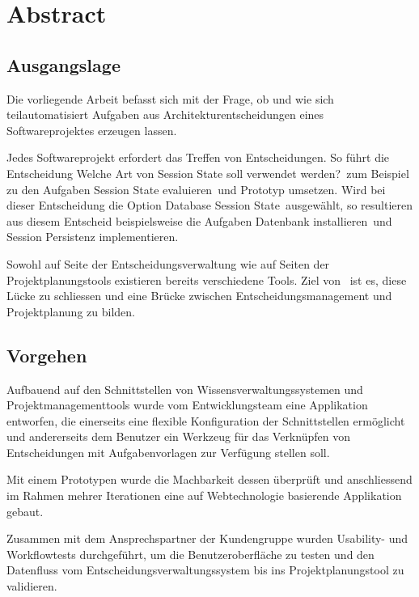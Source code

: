 \chapter{Abstract}

	\section{Ausgangslage}

	Die vorliegende Arbeit befasst sich mit der Frage,
	ob und wie sich teilautomatisiert Aufgaben aus Architekturentscheidungen eines Softwareprojektes erzeugen lassen.

	Jedes Softwareprojekt erfordert das Treffen von Entscheidungen.
	So führt die Entscheidung \flqq Welche Art von Session State soll verwendet werden?\frqq\ zum Beispiel zu den Aufgaben
	\flqq Session State evaluieren\frqq\ und \flqq Prototyp umsetzen\frqq.
	Wird bei dieser Entscheidung die Option \flqq Database Session State\frqq\ ausgewählt,
	so resultieren aus diesem Entscheid beispielsweise die Aufgaben \flqq Datenbank installieren\frqq\ und
	\flqq Session Persistenz implementieren\frqq.

	Sowohl auf Seite der Entscheidungsverwaltung wie auf Seiten der Projektplanungstools existieren bereits verschiedene Tools.
	Ziel von \eeppi\ ist es, diese Lücke zu schliessen und eine Brücke zwischen Entscheidungsmanagement und Projektplanung zu bilden.


	\section{Vorgehen}

	Aufbauend auf den Schnittstellen von Wissensverwaltungssystemen und Projektmanagementtools wurde vom Entwicklungsteam eine Applikation entworfen,
	die einerseits eine flexible Konfiguration der Schnittstellen ermöglicht
	und andererseits dem Benutzer ein Werkzeug für das Verknüpfen von Entscheidungen mit Aufgabenvorlagen zur Verfügung stellen soll.

	Mit einem Prototypen wurde die Machbarkeit dessen überprüft
	und anschliessend im Rahmen mehrer Iterationen eine auf Webtechnologie basierende Applikation gebaut.

	Zusammen mit dem Ansprechspartner der Kundengruppe wurden Usability- und Workflowtests durchgeführt, um die Benutzeroberfläche zu testen
	und den Datenfluss vom Entscheidungsverwaltungssystem bis ins Projektplanungstool zu validieren.

